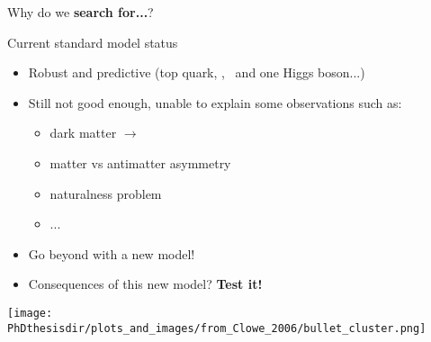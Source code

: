 \begin{frame}

\begin{center}
Why do we \textbf{search for...}?
\end{center}

\begin{minipage}[c]{.45\textwidth}
\begin{block}{Current standard model status}
\begin{itemize}
\item Robust and predictive (top quark, \Wboson, \Zboson\ and one Higgs boson...)
\item Still not good enough, unable to explain some observations such as:
\begin{itemize}
\item dark matter $\longrightarrow$
\item matter vs antimatter asymmetry
\item naturalness problem
\item ...
\end{itemize}
\item Go beyond with a new model!
\item Consequences of this new model? \textbf{\color{ltcolorred}Test it!}
\end{itemize}
\end{block}
\end{minipage}
\hfill
\begin{minipage}[c]{.45\textwidth}
\begin{center}
\texttt{[image: \\PhDthesisdir/plots\_and\_images/from\_Clowe\_2006/bullet\_cluster.png]}
\end{center}
\end{minipage}
\end{frame}

